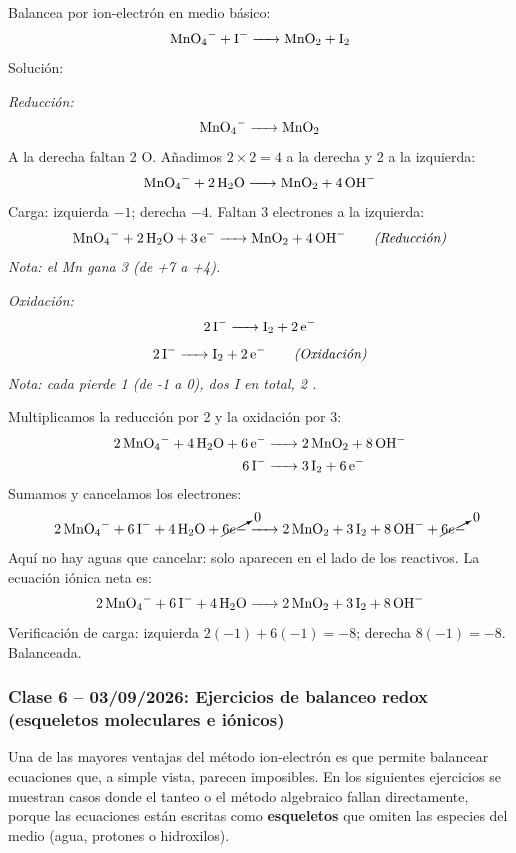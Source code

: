 \begin{exercise}{}{}
Balancea por ion-electrón en medio básico:
\[
\ce{MnO4- + I- -> MnO2 + I2}
\]
Solución:

\textit{Reducción:}
\[
\ce{MnO4- -> MnO2}
\]
A la derecha faltan 2 O. Añadimos $2 \times 2 = 4$  a la
derecha y 2  a la izquierda:
\[
\ce{MnO4- + 2H2O -> MnO2 + 4OH-}
\]
Carga: izquierda $-1$; derecha $-4$. Faltan 3 electrones a la
izquierda:
\begin{equation*}
\ce{MnO4- + 2H2O + 3e- -> MnO2 + 4OH-} \tag*{\textit{(Reducción)}}
\end{equation*}
\textit{Nota: el Mn gana 3  (de +7 a +4).}

\textit{Oxidación:}
\[
\ce{2I- -> I2 + 2e-}
\]
\begin{equation*}
\ce{2I- -> I2 + 2e-} \tag*{\textit{(Oxidación)}}
\end{equation*}
\textit{Nota: cada  pierde 1  (de -1 a 0), dos I en total, 2 .}

Multiplicamos la reducción por 2 y la oxidación por 3:
\begin{align*}
\ce{2MnO4- + 4H2O + 6e- &-> 2MnO2 + 8OH-} \\
\ce{6I- &-> 3I2 + 6e-}
\end{align*}
Sumamos y cancelamos los electrones:
\[
\ce{
2MnO4- + 6I- + 4H2O + \cancelto{0}{6e-}
-> 2MnO2 + 3I2 + 8OH- + \cancelto{0}{6e-}
}
\]
Aquí no hay aguas que cancelar: solo aparecen en el lado de los
reactivos. La ecuación iónica neta es:
\[
\ce{2MnO4- + 6I- + 4H2O -> 2MnO2 + 3I2 + 8OH-}
\]
Verificación de carga: izquierda $2(-1)+6(-1) = -8$; derecha
$8(-1) = -8$. Balanceada.
\end{exercise}

{}
\subsubsection*{\textcolor{blueunam}{Clase 6 -- 03/09/2026: Ejercicios de balanceo redox (esqueletos moleculares e iónicos)}}

Una de las mayores ventajas del método ion-electrón es que permite
balancear ecuaciones que, a simple vista, parecen imposibles. En
los siguientes ejercicios se muestran casos donde el tanteo o el
método algebraico fallan directamente, porque las ecuaciones
están escritas como \textbf{esqueletos} que omiten las especies
del medio (agua, protones o hidroxilos).

